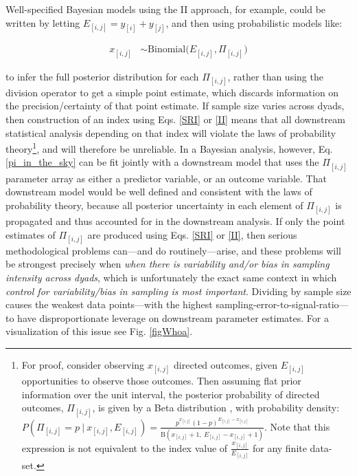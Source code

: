 \documentclass[Afour,sageh,times]{sagej}
\begin{document}
Well-specified Bayesian models using the II approach, for example, could be written by letting $E_{[i,j]}=y_{[i]} + y_{[j]}$, and then using probabilistic models like:
\begin{ceqn}
\begin{align}\label{pi_in_the_sky}
	x_{[i,j]} &\sim \mathrm{Binomial}\Big(E_{[i,j]}, \Pi_{[i,j]} \Big)
\end{align}
\end{ceqn}
to infer the full posterior distribution for each $\Pi_{[i,j]}$, rather than using the division operator to get a simple point estimate, which discards information on the precision/certainty of that point estimate. If sample size varies across dyads, then construction of an index using Eqs. \ref{SRI} or \ref{II} means that all downstream statistical analysis depending on that index will violate the laws of probability theory\footnote{For proof, consider observing $x_{[i,j]}$ directed outcomes, given $E_{[i,j]}$ opportunities to observe those outcomes. Then assuming flat prior information over the unit interval, the posterior probability of directed outcomes, $\Pi_{[i,j]}$, is given by a Beta distribution \citep{perks1947some}, with probability density: $P(\Pi_{[i,j]}= p~ |~x_{[i,j]}, E_{[i,j]}) = \frac{p^{x_{[i,j]}}(1-p)^{E_{[i,j]}-x_{[i,j]}}}{\text{B}(x_{[i,j]}+1,~ E_{[i,j]}-x_{[i,j]}+1)}$. Note that this expression is not equivalent to the index value of $\frac{x_{[i,j]}}{E_{[i,j]}}$ for any finite data-set.}, and will therefore be unreliable.  In a Bayesian analysis, however, Eq. \ref{pi_in_the_sky} can be fit jointly with a downstream model that uses the $\Pi_{[i,j]}$ parameter array as either a predictor variable, or an outcome variable. That downstream model would be well defined and consistent with the laws of probability theory, because all posterior uncertainty in each element of $\Pi_{[i,j]}$ is propagated and thus accounted for in the downstream analysis. If only the point estimates of  $\Pi_{[i,j]}$ are produced using Eqs. \ref{SRI} or \ref{II}, then serious methodological problems can---and do routinely---arise, and these problems will be strongest precisely when \emph{when there is variability and/or bias in sampling intensity across dyads}, which is unfortunately the exact same context in which \emph{control for variability/bias in sampling is most important}. Dividing by sample size causes the weakest data points---with the highest sampling-error-to-signal-ratio---to have disproportionate leverage on downstream parameter estimates. For a visualization of this issue see Fig. \ref{figWhoa}.
\end{document}
